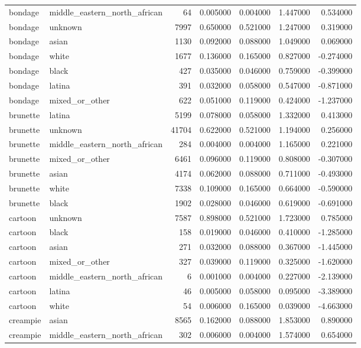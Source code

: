 \begin{tabular}{llrrrrr}
bondage & middle_eastern_north_african & 64 & 0.005000 & 0.004000 & 1.447000 & 0.534000 \\
bondage & unknown & 7997 & 0.650000 & 0.521000 & 1.247000 & 0.319000 \\
bondage & asian & 1130 & 0.092000 & 0.088000 & 1.049000 & 0.069000 \\
bondage & white & 1677 & 0.136000 & 0.165000 & 0.827000 & -0.274000 \\
bondage & black & 427 & 0.035000 & 0.046000 & 0.759000 & -0.399000 \\
bondage & latina & 391 & 0.032000 & 0.058000 & 0.547000 & -0.871000 \\
bondage & mixed_or_other & 622 & 0.051000 & 0.119000 & 0.424000 & -1.237000 \\
brunette & latina & 5199 & 0.078000 & 0.058000 & 1.332000 & 0.413000 \\
brunette & unknown & 41704 & 0.622000 & 0.521000 & 1.194000 & 0.256000 \\
brunette & middle_eastern_north_african & 284 & 0.004000 & 0.004000 & 1.165000 & 0.221000 \\
brunette & mixed_or_other & 6461 & 0.096000 & 0.119000 & 0.808000 & -0.307000 \\
brunette & asian & 4174 & 0.062000 & 0.088000 & 0.711000 & -0.493000 \\
brunette & white & 7338 & 0.109000 & 0.165000 & 0.664000 & -0.590000 \\
brunette & black & 1902 & 0.028000 & 0.046000 & 0.619000 & -0.691000 \\
cartoon & unknown & 7587 & 0.898000 & 0.521000 & 1.723000 & 0.785000 \\
cartoon & black & 158 & 0.019000 & 0.046000 & 0.410000 & -1.285000 \\
cartoon & asian & 271 & 0.032000 & 0.088000 & 0.367000 & -1.445000 \\
cartoon & mixed_or_other & 327 & 0.039000 & 0.119000 & 0.325000 & -1.620000 \\
cartoon & middle_eastern_north_african & 6 & 0.001000 & 0.004000 & 0.227000 & -2.139000 \\
cartoon & latina & 46 & 0.005000 & 0.058000 & 0.095000 & -3.389000 \\
cartoon & white & 54 & 0.006000 & 0.165000 & 0.039000 & -4.663000 \\
creampie & asian & 8565 & 0.162000 & 0.088000 & 1.853000 & 0.890000 \\
creampie & middle_eastern_north_african & 302 & 0.006000 & 0.004000 & 1.574000 & 0.654000 \\

\end{tabular}
